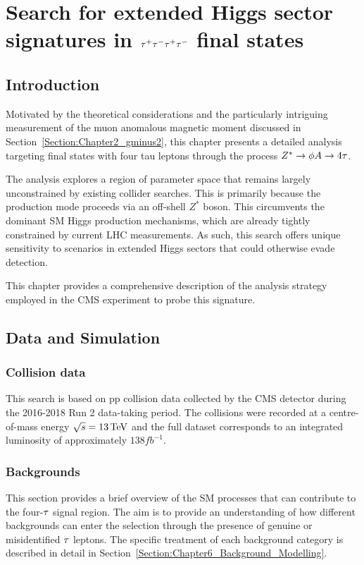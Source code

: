\chapter{\texorpdfstring{Search for extended Higgs sector signatures in $\tau^+\tau^-\tau^+\tau^-$ final states}{Search for extended Higgs sector signatures in tautautautau final states}}
\thispagestyle{plain}  %
\pagestyle{chapterpages}
\label{Section:Chapter_4tau}
\minitoc

\section{Introduction}

Motivated by the theoretical considerations and the particularly intriguing measurement of the muon anomalous magnetic moment discussed in Section~\ref{Section:Chapter2_gminus2}, this chapter presents a detailed analysis targeting final states with four tau leptons through the process $Z^*\rightarrow\phi A\rightarrow4\tau$.

The analysis explores a region of parameter space that remains largely unconstrained by existing collider searches. This is primarily because the production mode proceeds via an off-shell $Z^*$ boson. This circumvents the dominant SM Higgs production mechanisms, which are already tightly constrained by current LHC measurements. As such, this search offers unique sensitivity to scenarios in extended Higgs sectors that could otherwise evade detection.

This chapter provides a comprehensive description of the analysis strategy employed in the CMS experiment to probe this signature. 
\section{Data and Simulation}
\subsection{Collision data}

This search is based on pp collision data collected by the CMS detector during the 2016-2018 Run 2 data-taking period. The collisions were recorded at a centre-of-mass energy $\sqrt{s} = 13\,\text{Te\hspace{-.08em}V}$ and the full dataset corresponds to an integrated luminosity of approximately $138\unit{fb}^{-1}$.

\subsection{Backgrounds}
\label{Section:Chapter6_Backgrounds}
This section provides a brief overview of the SM processes that can contribute to the four-$\tau$ signal region. The aim is to provide an understanding of how different backgrounds can enter the selection through the presence of genuine or misidentified $\tau$ leptons. The specific treatment of each background category is described in detail in Section~\ref{Section:Chapter6_Background_Modelling}.

